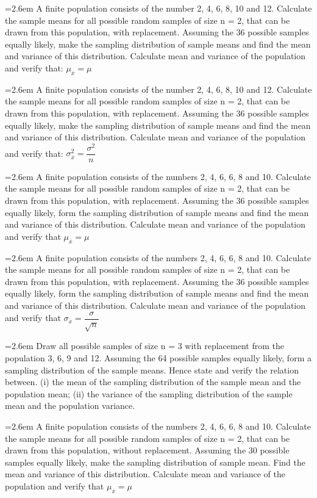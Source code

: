 \documentclass[11pt,a4paper]{article}
\newcommand{\Q}[2]{\par\smallskip\noindent\hangindent=2.6em\hangafter=1
  \makebox[2.6em][l]{\textbf{#1.}}#2\par}
\begin{document}
\Q{82}{A finite population consists of the number 2, 4, 6, 8, 10 and 12. Calculate the sample means for all possible random samples of size n = 2, that can be drawn from this population, with replacement. Assuming the 36 possible samples equally likely, make the sampling distribution of sample means and find the mean and variance of this distribution. Calculate mean and variance of the population and verify that: $\mu_{\overline{x}}=\mu$}
\Q{83}{A finite population consists of the number 2, 4, 6, 8, 10 and 12. Calculate the sample means for all possible random samples of size n = 2, that can be drawn from this population, with replacement. Assuming the 36 possible samples equally likely, make the sampling distribution of sample means and find the mean and variance of this distribution. Calculate mean and variance of the population and verify that: $\sigma^{2}_{\overline{x}}=\dfrac{\sigma^{2}}{n}$}
\Q{84}{A finite population consists of the numbers 2, 4, 6, 6, 8 and 10. Calculate the sample means for all possible random samples of size n = 2, that can be drawn from this population, with replacement. Assuming the 36 possible samples equally likely, form the sampling distribution of sample means and find the mean and variance of this distribution. Calculate mean and variance of the population and verify that $\mu_{\overline{x}}=\mu$}
\Q{85}{A finite population consists of the numbers 2, 4, 6, 6, 8 and 10. Calculate the sample means for all possible random samples of size n = 2, that can be drawn from this population, with replacement. Assuming the 36 possible samples equally likely, form the sampling distribution of sample means and find the mean and variance of this distribution. Calculate mean and variance of the population and verify that $\sigma_{\overline{x}}=\dfrac{\sigma}{\sqrt{n}}$}
\Q{86}{Draw all possible samples of size n = 3 with replacement from the population 3, 6, 9 and 12. Assuming the 64 possible samples equally likely, form a sampling distribution of the sample means. Hence state and verify the relation between. (i) the mean of the sampling distribution of the sample mean and the population mean; (ii) the variance of the sampling distribution of the sample mean and the population variance.}
\Q{87}{A finite population consists of the numbers 2, 4, 6, 6, 8 and 10. Calculate the sample means for all possible random samples of size n = 2, that can be drawn from this population, without replacement. Assuming the 30 possible samples equally likely, make the sampling distribution of sample mean. Find the mean and variance of this distribution. Calculate mean and variance of the population and verify that $\mu_{\overline{x}}=\mu$}
\end{document}
